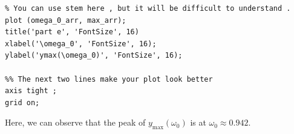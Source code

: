 \documentclass[12pt]{article}
\begin{document}
\begin{enumerate}[label=\textbf{\alph*)}, leftmargin=2.6em]
\begin{verbatim}
% You can use stem here , but it will be difficult to understand .
plot (omega_0_arr, max_arr);
title('part e', 'FontSize', 16)
xlabel('\omega_0', 'FontSize', 16);
ylabel('ymax(\omega_0)', 'FontSize', 16);

%% The next two lines make your plot look better
axis tight ;
grid on;
\end{verbatim}
Here, we can observe that the peak of $y_{\text{max}}(\omega_0)$ is at $\omega_0\approx0.942$.

\end{enumerate}
\end{document}
